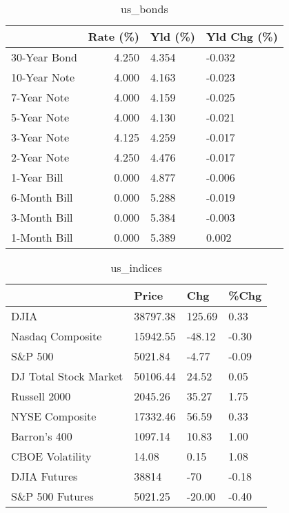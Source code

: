 \documentclass{article}%
\begin{document}
%


\begin{table}[htbp]%
\caption{us\_bonds}%
\centering%
\begin{adjustbox}{width=1\textwidth}%
\begin{tabular}{lrll}
\toprule
             &  Rate (\%) & Yld (\%) & Yld Chg (\%) \\
\midrule
30-Year Bond &     4.250 &   4.354 &      -0.032 \\
10-Year Note &     4.000 &   4.163 &      -0.023 \\
 7-Year Note &     4.000 &   4.159 &      -0.025 \\
 5-Year Note &     4.000 &   4.130 &      -0.021 \\
 3-Year Note &     4.125 &   4.259 &      -0.017 \\
 2-Year Note &     4.250 &   4.476 &      -0.017 \\
 1-Year Bill &     0.000 &   4.877 &      -0.006 \\
6-Month Bill &     0.000 &   5.288 &      -0.019 \\
3-Month Bill &     0.000 &   5.384 &      -0.003 \\
1-Month Bill &     0.000 &   5.389 &       0.002 \\
\bottomrule
\end{tabular}
%
\end{adjustbox}%
\end{table}

%


\begin{table}[htbp]%
\caption{us\_indices}%
\centering%
\begin{adjustbox}{width=1\textwidth}%
\begin{tabular}{llll}
\toprule
                      &    Price &    Chg &  \%Chg \\
\midrule
                 DJIA & 38797.38 & 125.69 &  0.33 \\
     Nasdaq Composite & 15942.55 & -48.12 & -0.30 \\
              S\&P 500 &  5021.84 &  -4.77 & -0.09 \\
DJ Total Stock Market & 50106.44 &  24.52 &  0.05 \\
         Russell 2000 &  2045.26 &  35.27 &  1.75 \\
       NYSE Composite & 17332.46 &  56.59 &  0.33 \\
         Barron's 400 &  1097.14 &  10.83 &  1.00 \\
      CBOE Volatility &    14.08 &   0.15 &  1.08 \\
         DJIA Futures &    38814 &    -70 & -0.18 \\
      S\&P 500 Futures &  5021.25 & -20.00 & -0.40 \\
\bottomrule
\end{tabular}
%
\end{adjustbox}%
\end{table}
\end{document}
